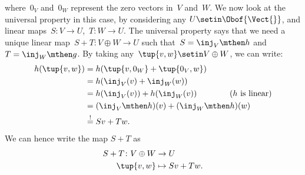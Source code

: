 \begin{example}
\begin{equation}
    \end{equation}
    where~$0_V$ and~$0_W$ represent the zero vectors in~$V$ and~$W$.
    We now look at the universal property in this case, by considering any  $U\setin \Obof{\Vect{}}$, and linear maps~$S\colon V\to U$,~$T\colon W\to U$.
    The universal property says that we need a unique linear map~$S+T\colon V\oplus W \to U$ such that~$S=\inj_V\mthen h$ and~$T=\inj_W\mthen g$.
    By taking any~$\tup{v,w}\setin V\oplus W$, we can write:
    \begin{equation}
        \begin{aligned}
            h(\tup{v,w}) & =h(\tup{v,0_W}+\tup{0_V,w}) \\
                         & =h(\inj_V(v)+\inj_W(w)) \\
                         & =h(\inj_V(v))+h(\inj_W(v)) \qquad \qquad (h \text{ is linear}) \\
                         & =(\inj_V\mthen h)(v)+(\inj_W\mthen h)(w) \\
                         & \overset{!
            }{=}
            Sv+Tw.
        \end{aligned}
    \end{equation}
    We can hence write the map $S+T$ as
    \begin{equation}
        \begin{aligned}
            S+T\colon V\oplus W & \to U \\
            \tup{v,w}           & \mapsto Sv+Tw.
        \end{aligned}
    \end{equation}
\end{example}
